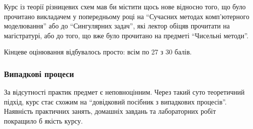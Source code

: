 \documentclass[14pt, a4paper]{extarticle}  %
\begin{document}
Курс із теорії різницевих схем мав би містити щось нове відносно того, що було прочитано викладачем у попередньому році на ``Сучасних методах комп'ютерного моделювання'' або до ``Сингулярних задач'', які лектор обіцяв прочитати на магістратурі, або до того, що вже було прочитано на предметі ``Чисельні методи''. 

Кінцеве оцінювання відбувалось просто: всім по 27 з 30 балів. 

\subsubsection{Випадкові процеси}

За відсутності практик предмет є неповноцінним. Через такий суто теоретичний підхід, курс стає схожим на ``довідковий посібник з випадкових процесів''. Наявність практичних занять, домашніх завдань та лабораторних робіт покращило б якість курсу. 


\end{document}

